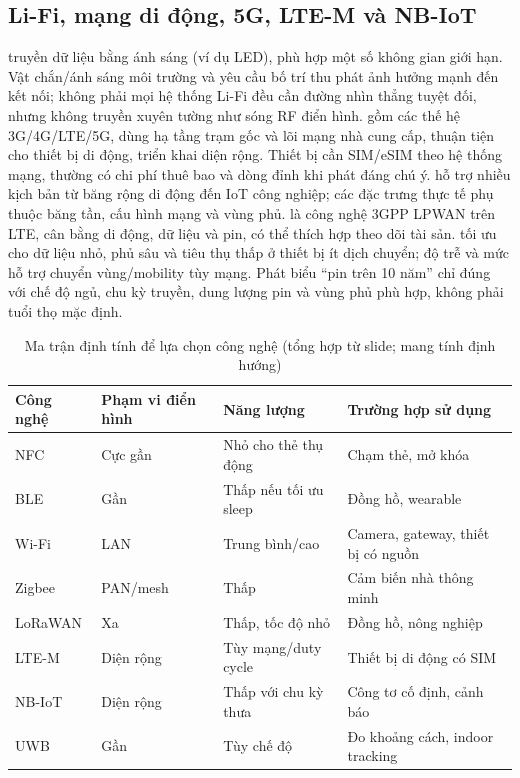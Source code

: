 \subsection{Li-Fi, mạng di động, 5G, LTE-M và NB-IoT}
 truyền dữ liệu bằng ánh sáng (ví dụ LED), phù hợp một số không gian giới hạn. Vật chắn/ánh sáng môi trường và yêu cầu bố trí thu phát ảnh hưởng mạnh đến kết nối; không phải mọi hệ thống Li-Fi đều cần đường nhìn thẳng tuyệt đối, nhưng không truyền xuyên tường như sóng RF điển hình.
 gồm các thế hệ 3G/4G/LTE/5G, dùng hạ tầng trạm gốc và lõi mạng nhà cung cấp, thuận tiện cho thiết bị di động, triển khai diện rộng. Thiết bị cần SIM/eSIM theo hệ thống mạng, thường có chi phí thuê bao và dòng đỉnh khi phát đáng chú ý.  hỗ trợ nhiều kịch bản từ băng rộng di động đến IoT công nghiệp; các đặc trưng thực tế phụ thuộc băng tần, cấu hình mạng và vùng phủ.
 là công nghệ 3GPP LPWAN trên LTE, cân bằng di động, dữ liệu và pin, có thể thích hợp theo dõi tài sản.  tối ưu cho dữ liệu nhỏ, phủ sâu và tiêu thụ thấp ở thiết bị ít dịch chuyển; độ trễ và mức hỗ trợ chuyển vùng/mobility tùy mạng. Phát biểu ``pin trên 10 năm'' chỉ đúng với chế độ ngủ, chu kỳ truyền, dung lượng pin và vùng phủ phù hợp, không phải tuổi thọ mặc định.
\begin{table}[htbp]\centering\small
\caption{Ma trận định tính để lựa chọn công nghệ (tổng hợp từ slide; mang tính định hướng)}
\begin{tabularx}{\textwidth}{@{}p{24mm}p{25mm}p{25mm}X@{}}\toprule
Công nghệ & Phạm vi điển hình & Năng lượng & Trường hợp sử dụng\\\midrule
NFC & Cực gần & Nhỏ cho thẻ thụ động & Chạm thẻ, mở khóa\\
BLE & Gần & Thấp nếu tối ưu sleep & Đồng hồ, wearable\\
Wi-Fi & LAN & Trung bình/cao & Camera, gateway, thiết bị có nguồn\\
Zigbee & PAN/mesh & Thấp & Cảm biến nhà thông minh\\
LoRaWAN & Xa & Thấp, tốc độ nhỏ & Đồng hồ, nông nghiệp\\
LTE-M & Diện rộng & Tùy mạng/duty cycle & Thiết bị di động có SIM\\
NB-IoT & Diện rộng & Thấp với chu kỳ thưa & Công tơ cố định, cảnh báo\\
UWB & Gần & Tùy chế độ & Đo khoảng cách, indoor tracking\\\bottomrule
\end{tabularx}
\end{table}